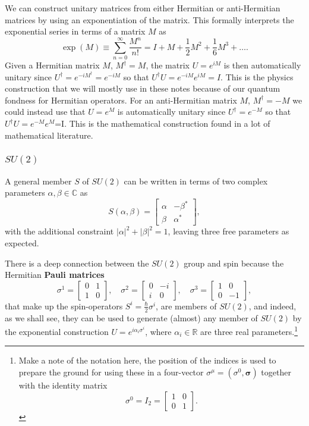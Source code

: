 \documentclass[notes.tex]{subfiles}
\begin{document}
We can construct unitary matrices from either Hermitian or anti-Hermitian matrices by using an exponentiation of the matrix. This formally interprets the exponential series in terms of a matrix $M$ as
\[ \exp(M)\equiv\sum_{n=0}^\infty \frac{M^n}{n!}=I+M+\frac{1}{2}M^2+\frac{1}{6}M^3+\ldots. \]
Given a Hermitian matrix $M$, $M^\dagger=M$, the matrix $U=e^{iM}$ is then automatically unitary since $U^\dagger=e^{-iM^\dagger}=e^{-iM}$ so that $U^\dagger U=e^{-iM}e^{iM}=I$. This is the physics construction that we will mostly use in these notes because of our quantum fondness for Hermitian operators. For an anti-Hermitian matrix $M$, $M^\dagger=-M$ we could instead use that $U=e^M$ is automatically unitary since $U^\dagger=e^{-M}$ so that $U^\dagger U=e^{-M}e^{M}$=I. This is the mathematical construction found in a lot of mathematical literature.


\subsubsection{$SU(2)$}
A general member $S$ of $SU(2)$ can be written in terms of two complex parameters $\alpha,\beta\in\mathbb{C}$ as
\begin{equation}
S(\alpha,\beta)=\left[
\begin{matrix} \alpha & -\beta^* \\ \beta & \alpha^* \end{matrix}
\right],
\label{eq:SU2_parameterisation}
\end{equation}
with the additional constraint $|\alpha|^2+|\beta|^2=1$, leaving three free parameters as expected. 

There is a deep connection between the $SU(2)$ group and spin because the Hermitian {\bf Pauli matrices} 
\begin{equation}
\sigma^1 =\left[\begin{matrix} 0 & 1 \\ 1 & 0 \end{matrix}\right], 
\quad \sigma^2 =\left[\begin{matrix} 0 & -i \\ i & 0 \end{matrix}\right], 
\quad \sigma^3 =\left[\begin{matrix} 1 & 0 \\ 0 & -1 \end{matrix}\right],
\label{eq:pauli_matrices}
\end{equation}
that make up the spin-operators $S^i=\frac{\hbar}{2}\sigma^i$, are members of $SU(2)$, and indeed, as we shall see, they can be used to generate (almost) any member of $SU(2)$ by the exponential construction $U=e^{i\alpha_i\sigma^i}$, where $\alpha_i\in\mathbb R$ are three real parameters.\footnote{Make a note of the notation here, the position of the indices is used to prepare the ground for using these in a four-vector $\sigma^\mu=(\sigma^0,\boldsymbol{\sigma})$ together with the identity matrix 
\[ \sigma^0=I_2=\left[ \begin{matrix}1 &0  \\ 0 & 1  \end{matrix} \right].\] }
\end{document}
